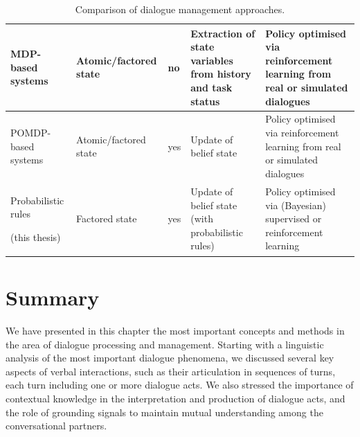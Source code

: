 \begin{table}
\begin{center}
\begin{tabular}{|p{55mm}||p{31mm}|p{16mm}|p{50mm}|p{66mm}|}
MDP-based systems  \; \; \; \; \; \; \; \; \begin{footnotesize}\citep[e.g.][]{Walker:2000,817450}\end{footnotesize} & Atomic/factored state & no & Extraction of state variables from history and task status & Policy optimised via reinforcement learning from real or simulated dialogues \vspace{5pt} \\ \hline
POMDP-based systems \; \; \; \; \; \; \begin{footnotesize}\citep[e.g.][]{Roy:2000,Young:2010}\end{footnotesize}\vspace{5pt} & Atomic/factored state & yes & Update of belief state & Policy optimised via reinforcement learning from real or simulated dialogues \vspace{5pt} \\ \hline
Probabilistic rules \; \; \; \; \; \; \; \; \; \; \begin{footnotesize} (this thesis)\end{footnotesize} & Factored state & yes & Update of belief state \; \; \; \; \; \; (with probabilistic rules) & Policy optimised via (Bayesian) supervised or reinforcement learning \vspace{5pt} \\ \hline 
\end{tabular}
\end{center}
\caption{Comparison of dialogue management approaches.}
\label{table:approaches}
\end{table}


\section{Summary}

We have presented in this chapter the most important concepts and methods in the area of dialogue processing and management.  Starting with a linguistic analysis of the most important dialogue phenomena, we discussed several key aspects of verbal interactions, such as their articulation in sequences of turns, each turn including one or more dialogue acts. We also stressed the importance of contextual knowledge in the interpretation and production of dialogue acts, and the role of grounding signals to maintain mutual understanding among the conversational partners. 

